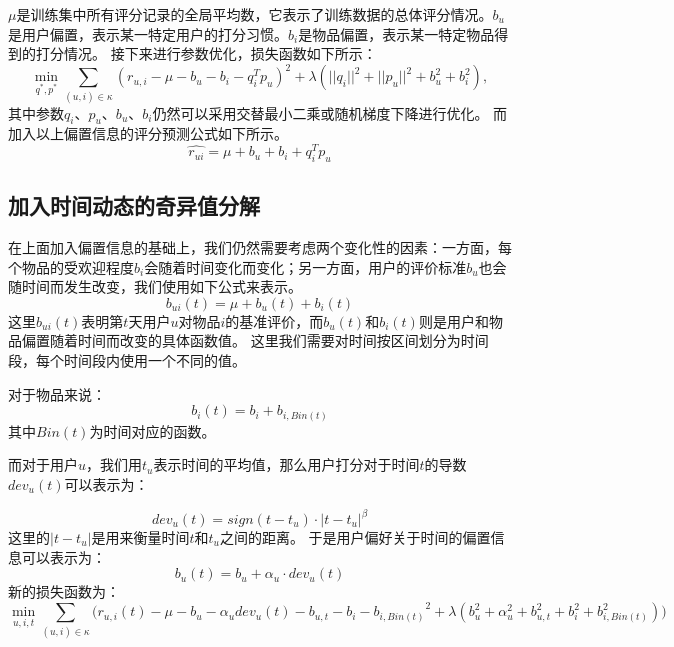 $\mu$是训练集中所有评分记录的全局平均数，它表示了训练数据的总体评分情况。$b_u$是用户偏置，表示某一特定用户的打分习惯。$b_i$是物品偏置，表示某一特定物品得到的打分情况。
接下来进行参数优化，损失函数如下所示：
\begin{equation}
\min_{q^*, p^*} {\sum\limits_{(u,i) \in \kappa} {{(r_{u,i}-\mu-b_u-b_i-q_i^Tp_u)}^2 + \lambda(||q_i||^2 + ||p_u||^2 + b_u^2 + b_i^2)} } ,
\end{equation}
其中参数$q_i$、$p_u$、$b_u$、$b_i$仍然可以采用交替最小二乘或随机梯度下降进行优化。
而加入以上偏置信息的评分预测公式如下所示。
\begin{equation}
\hat{r_{ui}} = \mu + b_u + b_i + q_i^Tp_u
\end{equation}

\subsection{加入时间动态的奇异值分解}
在上面加入偏置信息的基础上，我们仍然需要考虑两个变化性的因素：一方面，每个物品的受欢迎程度$b_i$会随着时间变化而变化；另一方面，用户的评价标准$b_u$也会随时间而发生改变，我们使用如下公式来表示。
\begin{equation}
b_{ui}(t) = \mu + b_u(t) + b_i(t)
\end{equation}
这里$b_{ui}(t)$表明第$t$天用户$u$对物品$i$的基准评价，而$b_u(t)$和$b_i(t)$则是用户和物品偏置随着时间而改变的具体函数值。
这里我们需要对时间按区间划分为时间段，每个时间段内使用一个不同的值。

对于物品来说：
\begin{equation}
b_i(t) = b_i + b_{i,Bin(t)}
\end{equation}
其中$Bin(t)$为时间对应的函数。

而对于用户$u$，我们用$t_u$表示时间的平均值，那么用户打分对于时间$t$的导数$dev_u(t)$可以表示为：

\begin{equation*}
dev_u(t) = sign(t - t_u)\cdot |t - t_u|^\beta
\end{equation*}
这里的$|t - t_u|$是用来衡量时间$t$和$t_u$之间的距离。
于是用户偏好关于时间的偏置信息可以表示为：
\begin{equation}
b_u(t) = b_u + \alpha_u \cdot dev_u(t)
\end{equation}
新的损失函数为：
\begin{equation*}
\min_{u, i, t} {\sum\limits_{(u,i) \in \kappa} {{(r_{u,i}(t)-\mu-b_u - \alpha_udev_u(t)-b_{u,t}-b_i - b_{i,Bin(t)}}^2 + \lambda(b_u^2 + \alpha_u^2 + b_{u,t}^2 + b_i^2 + b_{i,Bin(t)}^2))}} 
\end{equation*}

